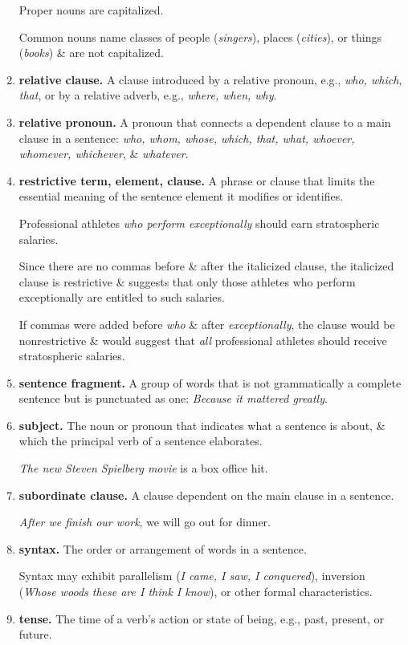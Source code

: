 \documentclass{article}
\begin{document}
\begin{enumerate}
	Proper nouns are capitalized.
	
	Common nouns name classes of people ({\it singers}), places ({\it cities}), or things ({\it books}) \& are not capitalized.
	\item {\bf relative clause.} A clause introduced by a relative pronoun, e.g., {\it who, which, that}, or by a relative adverb, e.g., {\it where, when, why}.
	\item {\bf relative pronoun.} A pronoun that connects a dependent clause to a main clause in a sentence: {\it who, whom, whose, which, that, what, whoever, whomever, whichever}, \& {\it whatever}.
	\item {\bf restrictive term, element, clause.} A phrase or clause that limits the essential meaning of the sentence element it modifies or identifies.
	
	Professional athletes {\it who perform exceptionally} should earn stratospheric salaries.
	
	Since there are no commas before \& after the italicized clause, the italicized clause is restrictive \& suggests that only those athletes who perform exceptionally are entitled to such salaries.
	
	If commas were added before {\it who} \& after {\it exceptionally}, the clause would be nonrestrictive \& would suggest that {\it all} professional athletes should receive stratospheric salaries.
	\item {\bf sentence fragment.} A group of words that is not grammatically a complete sentence but is punctuated as one: {\it Because it mattered greatly}.
	\item {\bf subject.} The noun or pronoun that indicates what a sentence is about, \& which the principal verb of a sentence elaborates.
	
	{\it The new Steven Spielberg movie} is a box office hit.
	\item {\bf subordinate clause.} A clause dependent on the main clause in a sentence.
	
	{\it After we finish our work}, we will go out for dinner.
	\item {\bf syntax.} The order or arrangement of words in a sentence.
	
	Syntax may exhibit parallelism ({\it I came, I saw, I conquered}), inversion ({\it Whose woods these are I think I know}), or other formal characteristics.
	\item {\bf tense.} The time of a verb's action or state of being, e.g., past, present, or future.
	

\end{enumerate}
\end{document}
